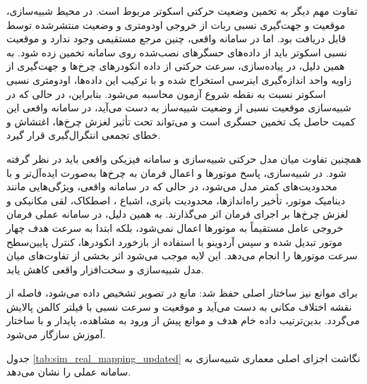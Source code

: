 تفاوت مهم دیگر به تخمین وضعیت حرکتی اسکوتر مربوط است. در محیط شبیه‌سازی، موقعیت و جهت‌گیری نسبی ربات از خروجی اودومتری و وضعیت منتشرشده توسط  قابل دریافت بود. اما در سامانه واقعی، چنین مرجع مستقیمی وجود ندارد و موقعیت نسبی اسکوتر باید از داده‌های حسگرهای نصب‌شده روی سامانه تخمین زده شود. به همین دلیل، در پیاده‌سازی، سرعت حرکتی از داده انکودرهای چرخ‌ها و جهت‌گیری از زاویه  واحد اندازه‌گیری اینرسی استخراج شده و با ترکیب این داده‌ها، اودومتری نسبی اسکوتر نسبت به نقطه شروع آزمون محاسبه می‌شود. بنابراین، در حالی که در شبیه‌سازی موقعیت نسبی از وضعیت شبیه‌ساز به دست می‌آید، در سامانه واقعی این کمیت حاصل یک تخمین حسگری است و می‌تواند تحت تأثیر لغزش چرخ‌ها، اغتشاش  و خطای تجمعی انتگرال‌گیری قرار گیرد.

همچنین تفاوت میان مدل حرکتی شبیه‌سازی و سامانه فیزیکی واقعی باید در نظر گرفته شود. در شبیه‌سازی، پاسخ موتورها و اعمال فرمان به چرخ‌ها به‌صورت ایده‌آل‌تر و با محدودیت‌های کمتر مدل می‌شود، در حالی که در سامانه واقعی، ویژگی‌هایی مانند دینامیک موتور، تأخیر راه‌اندازها، محدودیت باتری، اشباع ، اصطکاک، لقی مکانیکی و لغزش چرخ‌ها بر اجرای فرمان اثر می‌گذارند. به همین دلیل، در سامانه عملی فرمان خروجی عامل مستقیماً به موتورها اعمال نمی‌شود، بلکه ابتدا به سرعت هدف چهار موتور تبدیل شده و سپس آردوینو با استفاده از بازخورد انکودرها، کنترل پایین‌سطح سرعت موتورها را انجام می‌دهد. این لایه موجب می‌شود اثر بخشی از تفاوت‌های میان مدل شبیه‌سازی و سخت‌افزار واقعی کاهش یابد.

برای موانع نیز ساختار اصلی حفظ شد: مانع در تصویر تشخیص داده می‌شود، فاصله از نقشه اختلاف مکانی به دست می‌آید و موقعیت و سرعت نسبی با فیلتر کالمن پالایش می‌گردد. بدین‌ترتیب داده خام هدف و موانع پیش از ورود به مشاهده، پایدار و با ساختار آموزش سازگار می‌شود.

جدول \ref{tab:sim_real_mapping_updated} نگاشت اجزای اصلی معماری شبیه‌سازی به سامانه عملی را نشان می‌دهد.

